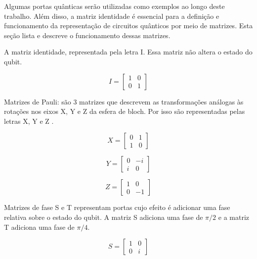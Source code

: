 Algumas portas quânticas serão utilizadas como exemplos ao longo deste trabalho. Além disso, a matriz identidade é essencial para a definição e funcionamento da representação de circuitos quânticos por meio de matrizes. Esta seção lista e descreve o funcionamento dessas matrizes.

A matriz identidade, representada pela letra I. Essa matriz não altera o estado do qubit.

\begin{equation}
  I = \begin{bmatrix}
    1 & 0 \\
    0 & 1
  \end{bmatrix}
\end{equation}

Matrizes de Pauli: são 3 matrizes que descrevem as transformações análogas às rotações nos eixos X, Y e Z da esfera de bloch. Por isso são representadas pelas letras X, Y e Z \cite{nielsen2010quantum}.

\begin{equation}
  X = \begin{bmatrix}
    0 & 1 \\
    1 & 0
  \end{bmatrix}
\end{equation}

\begin{equation}
  Y = \begin{bmatrix}
    0 & -i \\
    i & 0
  \end{bmatrix}
\end{equation}

\begin{equation}
  Z = \begin{bmatrix}
    1 & 0 \\
    0 & -1
  \end{bmatrix}
\end{equation}

Matrizes de fase S e T representam portas cujo efeito é adicionar uma fase relativa sobre o estado  do qubit. A matriz S adiciona uma fase de $\pi/2$ e a matriz T adiciona uma fase de $\pi/4$.

\begin{equation}
  S = \begin{bmatrix}
    1 & 0 \\
    0 & i
  \end{bmatrix}
\end{equation}

